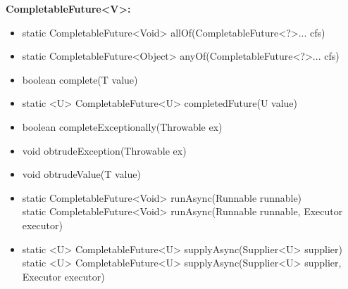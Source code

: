 \documentclass[]{usiinfthesis}
\begin{document}
{\noindent
\textbf{CompletableFuture<V>:}
\begin{itemize}
    \item   static CompletableFuture<Void> allOf(CompletableFuture<?>... cfs)
    \item   static CompletableFuture<Object> anyOf(CompletableFuture<?>... cfs)
    \item   boolean complete(T value)
    \item   static <U> CompletableFuture<U> completedFuture(U value)
    \item   boolean completeExceptionally(Throwable ex)
    \item   void obtrudeException(Throwable ex)
    \item   void obtrudeValue(T value)
    \item   static CompletableFuture<Void> runAsync(Runnable runnable)
    \mbox{}\\ static CompletableFuture<Void> runAsync(Runnable runnable, Executor executor)
    \item   static <U> CompletableFuture<U> supplyAsync(Supplier<U> supplier)
    \mbox{}\\ static <U> CompletableFuture<U> supplyAsync(Supplier<U> supplier, Executor executor)
\end{itemize}
}
\end{document}
